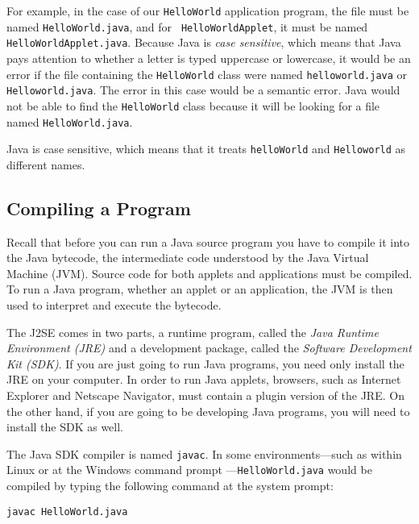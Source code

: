 \noindent For example, in the case of our {\tt HelloWorld} application program, 
the file must be named {\tt HelloWorld.java}, and for {\tt
HelloWorldApplet}, it must be named {\tt HelloWorldApplet.java}.
Because Java is {\em case sensitive}, which means that Java pays
attention to whether a letter is typed uppercase or lowercase, it
would be an error if the file containing the {\tt HelloWorld} class
were named {\tt helloworld.java} or {\tt Helloworld.java}.  The error
in this case would be a semantic error. Java would not be able to find
the {\tt HelloWorld} class because it will be looking for a file named
{\tt HelloWorld.java}.

 {Java is case sensitive,
which means that it treats {\tt helloWorld} and {\tt Helloworld}
as different names.}

\subsection{Compiling a Program}

\noindent Recall that before you can run a Java source program you
have to compile it into the Java  bytecode, the intermediate code
understood by the Java Virtual Machine (JVM).  Source code for both
applets and applications must be compiled.  To run a Java
program, whether an applet or an application, the JVM is then used to
interpret and execute the bytecode.

The J2SE comes in two parts, a runtime program, called the {\it Java
Runtime Environment (JRE)} and a development package, called the {\em
Software Development Kit (SDK)}. If you are just going to run Java
programs, you need only install the JRE on your computer. In order to
run Java applets, browsers, such as Internet Explorer and Netscape
Navigator, must contain a plugin version of the JRE.  On the other
hand, if you are going to be developing Java programs, you will need
to install the SDK as well.

The Java SDK compiler is named {\tt javac}. In some
environments---such as within Linux or at the Windows command prompt
---{\tt HelloWorld.java} would be compiled by typing the
following command at the system prompt:

\begin{jjjlisting}
\begin{lstlisting}
javac HelloWorld.java
\end{lstlisting}
\end{jjjlisting}

